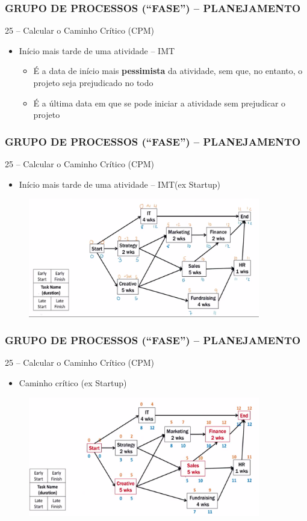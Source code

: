 \begin{frame}
 \frametitle{GRUPO DE PROCESSOS (“FASE”) – PLANEJAMENTO}
25 – Calcular o Caminho Crítico (CPM)
  \begin{itemize}
   \item Início mais tarde de uma atividade – IMT
   \begin{itemize}
    \item É a data de início mais \textbf{pessimista} da atividade, sem que, no entanto, o projeto seja prejudicado no todo
    \item É a última data em que se pode iniciar a atividade sem prejudicar o projeto
   \end{itemize}
  \end{itemize}
\end{frame}

\begin{frame}
 \frametitle{GRUPO DE PROCESSOS (“FASE”) – PLANEJAMENTO}
25 – Calcular o Caminho Crítico (CPM)
 \begin{itemize}
  \item  Início mais tarde de uma atividade – IMT(ex Startup)
 \end{itemize}
  \begin{figure}
   \centering
   \includegraphics[width = 0.9\textwidth]{figs/fig27.png}
  \end{figure}
\end{frame}


\begin{frame}
 \frametitle{GRUPO DE PROCESSOS (“FASE”) – PLANEJAMENTO}
25 – Calcular o Caminho Crítico (CPM)
 \begin{itemize}
  \item  Caminho crítico (ex Startup)
 \end{itemize}
  \begin{figure}
   \centering
   \includegraphics[width = 0.9\textwidth]{figs/fig28.png}
  \end{figure}
\end{frame}

